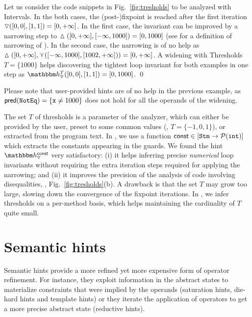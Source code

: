 \documentclass{llncs}
\newcommand{\sopra}{\vspace{-.3cm}}
\begin{document}
\begin{example}
Let us consider the code snippets in Fig.~\ref{fig:tresholds} to be analyzed with Intervals.
In the both cases, the (post-)fixpoint is reached after the first iteration $\triangledown([0,0],  [1,1]) = [0, +\infty]$.
In the first case, the invariant can be improved by a narrowing step to $ \vartriangle([0, +\infty], [-\infty, 1000])= [0, 1000]$ (see \cite{CousotCousot77} for a definition of narrowing of \Intervals).
In the second case, the narrowing is of no help as  $\vartriangle([0, +\infty], \curlyvee([-\infty, 1000],  [1002, +\infty])) = [0, +\infty]$.
A widening with Thresholds $T = \{ 1000 \}$ helps discovering the tightest loop invariant for both examples in one step as $\hint{\widening}^T([0,0],[1,1]) = [0, 1000]$.
\qed
\end{example}
Please note that user-provided hints are of no help in the previous example, as $\mathsf{pred}(\mathtt{NotEq}) = \{ \mathtt{x} \neq 1000\}$ does not hold for  all the operands of the widening. 

The set $T$ of thresholds is a parameter of the analyzer, which can either be provided by the user,  preset to some common values (\eg, $T = \{ -1, 0, 1\}$), or extracted from the program  text.
In \Clousot, we use a function $\mathsf{const} \in
[\mathtt{Stm} \rightarrow\mathcal{P}{(\mathtt{int})}]$ which extracts the constants appearing in the guards.
We found the hint $\hint{\widening}^{\mathsf{const}}$ very satisfactory: (i) it helps inferring precise \emph{numerical} loop invariants  without requiring the extra iteration steps required for applying the narrowing; and (ii) it improves the precision of the analysis of code involving disequalities, \eg, Fig.~\ref{fig:tresholds}(b).
A drawback  is that the set $T$ may grow too large, slowing down the convergence of the fixpoint iterations.
In \Clousot, we infer thresholds on a per-method basis, which helps maintaining the cardinality of $T$ quite small.

\sopra
\section{Semantic hints}
Semantic hints provide a more refined yet more expensive form of operator refinement.
For instance, they exploit information in the abstract states to materialize constraints that were implied by the operands (saturation hints, die-hard hints and template hints) or they iterate the application of operators to get a more precise abstract state (reductive hints).
\end{document}
